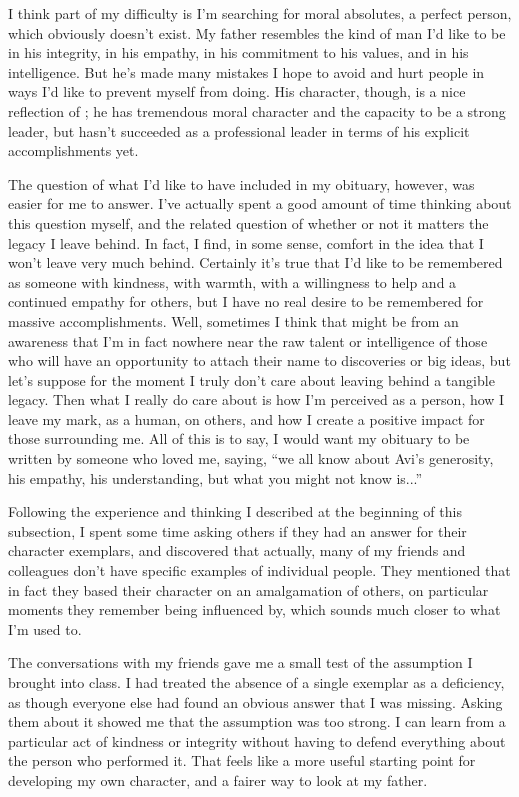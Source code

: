 \documentclass[12pt,stu,biblatex]{apa7}
\begin{document}
I think part of my difficulty is I'm searching for moral absolutes, a perfect person, which obviously doesn't exist.
My father resembles the kind of man I'd like to be in his integrity, in his empathy, in his commitment to his values, and in his intelligence.
But he's made many mistakes I hope to avoid and hurt people in ways I'd like to prevent myself from doing.
His character, though, is a nice reflection of \parencite{wood2021goodbadevil}; he has tremendous moral character and the capacity to be a strong leader, but hasn't succeeded as a professional leader in terms of his explicit accomplishments yet.

The question of what I'd like to have included in my obituary, however, was easier for me to answer.
I've actually spent a good amount of time thinking about this question myself, and the related question of whether or not it matters the legacy I leave behind.
In fact, I find, in some sense, comfort in the idea that I won't leave very much behind.
Certainly it's true that I'd like to be remembered as someone with kindness, with warmth, with a willingness to help and a continued empathy for others, but I have no real desire to be remembered for massive accomplishments.
Well, sometimes I think that might be from an awareness that I'm in fact nowhere near the raw talent or intelligence of those who will have an opportunity to attach their name to discoveries or big ideas, but let's suppose for the moment I truly don't care about leaving behind a tangible legacy.
Then what I really do care about is how I'm perceived as a person, how I leave my mark, as a human, on others, and how I create a positive impact for those surrounding me.
All of this is to say, I would want my obituary to be written by someone who loved me, saying, ``we all know about Avi's generosity, his empathy, his understanding, but what you might not know is...''

Following the experience and thinking I described at the beginning of this subsection, I spent some time asking others if they had an answer for their character exemplars, and discovered that actually, many of my friends and colleagues don't have specific examples of individual people.
They mentioned that in fact they based their character on an amalgamation of others, on particular moments they remember being influenced by, which sounds much closer to what I'm used to.

The conversations with my friends gave me a small test of the assumption I brought into class.
I had treated the absence of a single exemplar as a deficiency, as though everyone else had found an obvious answer that I was missing.
Asking them about it showed me that the assumption was too strong.
I can learn from a particular act of kindness or integrity without having to defend everything about the person who performed it.
That feels like a more useful starting point for developing my own character, and a fairer way to look at my father.
\end{document}

